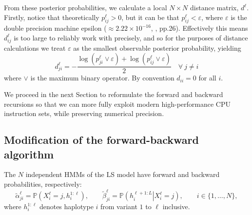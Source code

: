 \documentclass[pdflatex,referee,lineno,sn-nature]{sn-jnl}%
\begin{document}
From these posterior probabilities, we calculate a local \(N \times N\) distance matrix, \(d^\ell\).
Firstly, notice that theoretically \(p_{ij}^\ell > 0\), but it can be that \(p_{ij}^\ell < \varepsilon\), where \(\varepsilon\) is the double precision machine epsilon (\(\approx 2.22\times10^{-16}\), \cite{C18}, pp.26).
Effectively this means \(d_{ij}^\ell\) is too large to reliably work with precisely, and so for the purposes of distance calculations we treat \(\varepsilon\) as the smallest observable posterior probability, yielding \begin{equation}
	d_{ji}^\ell = -\frac{\log\left(p_{ji}^\ell \vee \varepsilon \right) + \log\left(p_{ij}^\ell \vee \varepsilon  \right)}{2} \quad \forall\ j \neq i \label{eq:distmat}
\end{equation}
where \(\vee\) is the maximum binary operator.
By convention \(d_{ii} = 0\) for all \(i\).

We proceed in the next Section to reformulate the forward and backward recursions so that we can more fully exploit modern high-performance CPU instruction sets, while preserving numerical precision.



\subsection*{Modification of the forward-backward algorithm}
\label{sec:reformulation}

The \(N\) independent HMMs of the LS model have forward and backward probabilities, respectively: \begin{equation*}
	\tilde{\alpha}_{ji}^{\ell} = \mathbb{P}\left( X_i^\ell = j, h_i^{1:\ell} \right), \qquad
	\tilde{\beta}_{ji}^{\ell} = \mathbb{P}\left(\left.  h_i^{\ell+1 : L}  \right| X_i^\ell = j \right), \qquad i \in \{1,\dots,N\} ,
\end{equation*}
where \(h_{i}^{1:\ell}\) denotes haplotype \(i\) from variant \(1\) to \(\ell\) inclusive.
\end{document}
